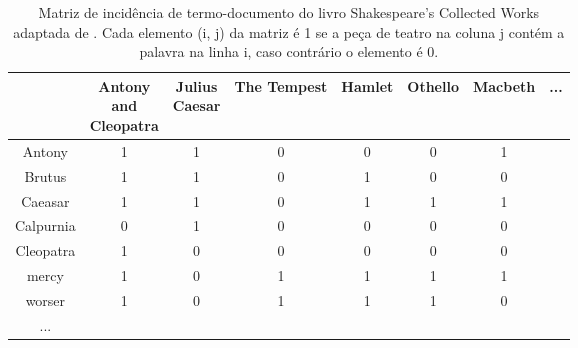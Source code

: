 \begin{table}[H]
    \centering
    \begin{tabular}{|c|c|c|c|c|c|c|c}\hline
         \diagbox{Palavra}{\raisebox{-1.27cm}{\rotatebox{90}{\parbox{1.6cm}{\centering Peça \\ de teatro}}}} & \makecell{Antony \\ and \\ Cleopatra} & \makecell{Julius \\ Caesar} & The Tempest & Hamlet & Othello & Macbeth & ... \\ \hline
         Antony     & 1 & 1 & 0 & 0 & 0 & 1 & \\
         Brutus     & 1 & 1 & 0 & 1 & 0 & 0 & \\
         Caeasar    & 1 & 1 & 0 & 1 & 1 & 1 & \\
         Calpurnia  & 0 & 1 & 0 & 0 & 0 & 0 & \\
         Cleopatra  & 1 & 0 & 0 & 0 & 0 & 0 & \\
         mercy      & 1 & 0 & 1 & 1 & 1 & 1 & \\
         worser     & 1 & 0 & 1 & 1 & 1 & 0 & \\
         ...        & & & & & & & 
    \end{tabular}
    \caption{Matriz de incidência de termo-documento do livro Shakespeare’s Collected Works adaptada de . Cada elemento (i, j) da matriz é 1 se a peça de teatro na coluna j contém a palavra na linha i, caso contrário o elemento é 0.}
    \label{tab:matriz-incidência-termo-documento}
\end{table}